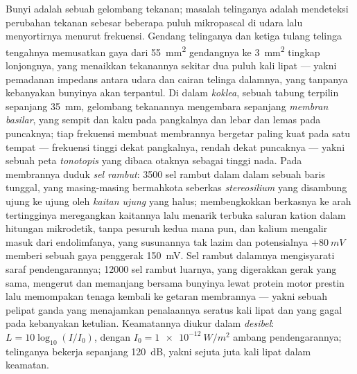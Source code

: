 \begin{definition}[Koklea]\label{def:b3:sensory-systems:cochlea}
%
Bunyi adalah sebuah gelombang tekanan; masalah telinganya adalah mendeteksi
perubahan tekanan sebesar beberapa puluh mikropascal di udara lalu menyortirnya
menurut frekuensi. Gendang telinganya dan ketiga tulang telinga tengahnya
memusatkan gaya dari \qty{55}{mm^2} gendangnya ke \qty{3}{mm^2} tingkap
lonjongnya, yang menaikkan tekanannya sekitar dua puluh kali lipat --- yakni
pemadanan impedans antara udara dan cairan telinga dalamnya, yang tanpanya
kebanyakan bunyinya akan terpantul. Di dalam \emph{koklea}, sebuah tabung terpilin
sepanjang \qty{35}{mm}, gelombang tekanannya mengembara sepanjang \emph{membran
basilar}, yang sempit dan kaku pada pangkalnya dan lebar dan lemas pada
puncaknya; tiap frekuensi membuat membrannya bergetar paling kuat pada satu tempat
--- frekuensi tinggi dekat pangkalnya, rendah dekat puncaknya --- yakni sebuah
peta \emph{tonotopis} yang dibaca otaknya sebagai tinggi nada. Pada membrannya duduk
\emph{sel rambut}: \num{3500} sel rambut dalam dalam sebuah baris tunggal,
yang masing-masing bermahkota seberkas \emph{stereosilium} yang disambung ujung ke ujung oleh
\emph{kaitan ujung} yang halus; membengkokkan berkasnya ke arah  tertingginya
meregangkan kaitannya lalu menarik terbuka saluran kation dalam hitungan mikrodetik,
tanpa pesuruh kedua mana pun, dan kalium mengalir masuk dari
endolimfanya, yang susunannya tak lazim dan potensialnya $+\qty{80}{mV}$ memberi
sebuah gaya penggerak \qty{150}{mV}. Sel rambut dalamnya mengisyarati
saraf pendengarannya; \num{12000} sel rambut luarnya, yang digerakkan gerak yang sama,
mengerut dan memanjang bersama bunyinya lewat protein motor
prestin lalu memompakan tenaga kembali ke getaran membrannya --- yakni sebuah
pelipat ganda yang menajamkan penalaannya seratus kali lipat dan yang gagal pada kebanyakan
ketulian. Keamatannya diukur dalam \emph{desibel}: $L = 10\log_{10}
(I/I_{0})$, dengan $I_{0} = \qty{1e-12}{W/m^2}$ ambang pendengarannya;
telinganya bekerja sepanjang \qty{120}{dB}, yakni sejuta juta kali lipat dalam keamatan.
\end{definition}

